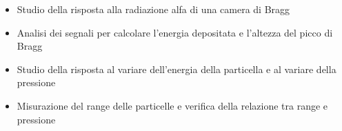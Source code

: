 \begin{itemize}
 \item Studio della risposta alla radiazione alfa di una camera di Bragg
 \item Analisi dei segnali per calcolare l'energia depositata e l'altezza del picco di Bragg
 \item Studio della risposta al variare dell'energia della particella e al variare della pressione
 \item Misurazione del range delle particelle e verifica della relazione tra range e pressione
\end{itemize}

